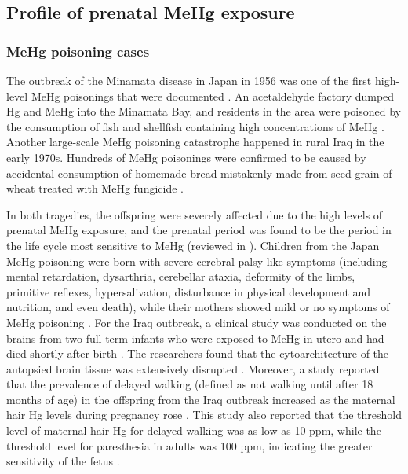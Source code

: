 \subsection{Profile of prenatal MeHg exposure}

\subsubsection{MeHg poisoning cases}

The outbreak of the Minamata disease in Japan in 1956 was one of the first high-level MeHg poisonings that were documented \cite{kurland1962minamata,harada1995minamata}. An acetaldehyde factory dumped Hg and MeHg into the Minamata Bay, and residents in the area were poisoned by the consumption of fish and shellfish containing high concentrations of MeHg \cite{harada1995minamata}. Another large-scale MeHg poisoning catastrophe happened in rural Iraq in the early 1970s. Hundreds of MeHg poisonings were confirmed to be caused by accidental consumption of homemade bread mistakenly made from seed grain of wheat treated with MeHg fungicide \cite{bakir1973methylmercury}. 

In both tragedies, the offspring were severely affected due to the high levels of prenatal MeHg exposure, and the prenatal period was found to be the period in the life cycle most sensitive to MeHg (reviewed in \cite{clarkson2006toxicology}). Children from the Japan MeHg poisoning were born with severe cerebral palsy-like symptoms (including mental retardation, dysarthria, cerebellar ataxia, deformity of the limbs, primitive reflexes, hypersalivation, disturbance in physical development and nutrition, and even death), while their mothers showed mild or no symptoms of MeHg poisoning \cite{harada1995minamata}. For the Iraq outbreak, a clinical study was conducted on the brains from two full-term infants who were exposed to MeHg in utero and had died shortly after birth \cite{choi1978abnormal}. The researchers found that the cytoarchitecture of the autopsied brain tissue was extensively disrupted \cite{choi1978abnormal}. Moreover, a study reported that the prevalence of delayed walking (defined as not walking until after 18 months of age) in the offspring from the Iraq outbreak increased as the maternal hair Hg levels during pregnancy rose \cite{cox1989dose}. This study also reported that the threshold level of maternal hair Hg for delayed walking was as low as 10 ppm, while the threshold level for paresthesia in adults was 100 ppm, indicating the greater sensitivity of the fetus \cite{cox1989dose}. 

